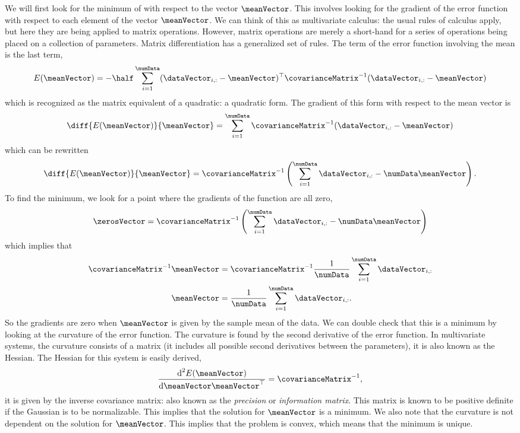 We will first look for the minimum of  with
respect to the vector $\meanVector$. This involves looking for the
gradient of the error function with respect to each element of the
vector $\meanVector$. We can think of this as multivariate calculus:
the usual rules of calculus apply, but here they are being applied to
matrix operations. However, matrix operations are merely a short-hand
for a series of operations being placed on a collection of
parameters. Matrix differentiation has a
generalized set of rules. The term of the error function involving the
mean is the last term,
\[
E(\meanVector) = -\half\sum_{i=1}^\numData
(\dataVector_{i, :}-\meanVector)^\top
\covarianceMatrix^{-1}(\dataVector_{i, :}-\meanVector)
\]
which is recognized as the matrix equivalent of a quadratic: a
quadratic form. The gradient of this form with
respect to the mean vector is
\[
\diff{E(\meanVector)}{\meanVector} = \sum_{i=1}^\numData
\covarianceMatrix^{-1}(\dataVector_{i, :}-\meanVector)
\]
which can be rewritten
\[
\diff{E(\meanVector)}{\meanVector} =
\covarianceMatrix^{-1}\left(\sum_{i=1}^\numData\dataVector_{i,
    :}-\numData\meanVector\right).
\]
To find the minimum, we look for a point where the gradients of the
function are all zero,
\[
\zerosVector =
\covarianceMatrix^{-1}\left(\sum_{i=1}^\numData\dataVector_{i,
    :}-\numData\meanVector\right)
\]
which implies that
\begin{align*}
  \covarianceMatrix^{-1}\meanVector & = \covarianceMatrix^{-1}\frac{1}{\numData} \sum_{i=1}^\numData \dataVector_{i,:}\\
  \meanVector & = \frac{1}{\numData}
  \sum_{i=1}^\numData \dataVector_{i,:}.
\end{align*}
So the gradients are zero when $\meanVector$ is given by the sample
mean of the data. We can double check that this is a minimum by
looking at the curvature of the error function. The curvature is found
by the second derivative of the error function. In multivariate
systems, the curvature consists of a matrix (it includes all possible
second derivatives between the parameters), it is also known as the
Hessian. The Hessian for this system is easily derived,
\[
\frac{\text{d}^2E(\meanVector)}{\text{d}\meanVector\meanVector^\top}
= \covarianceMatrix^{-1},
\]
it is given by the inverse covariance matrix: also known as the
\emph{precision} or \emph{information
  matrix}. This matrix is known
to be positive definite if the Gaussian is to be normalizable. This
implies that the solution for $\meanVector$ is a minimum. We also note
that the curvature is not dependent on the solution for
$\meanVector$. This implies that the problem is convex, which means
that the minimum is unique. 


